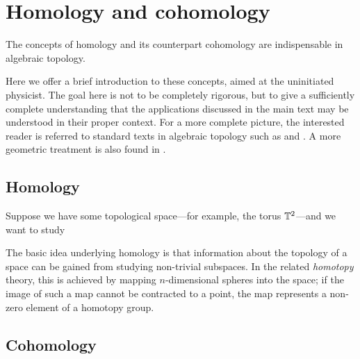 \chapter{Homology and cohomology}\label{chap:homology}

The concepts of homology and its counterpart cohomology are indispensable in algebraic topology. \red{[\ldots]}  %

Here we offer a brief introduction to these concepts, aimed at the uninitiated physicist. The goal here is not to be completely rigorous, but to give a sufficiently complete understanding that the applications discussed in the main text may be understood in their proper context. For a more complete picture, the interested reader is referred to standard texts in algebraic topology such as \cite{Hatcher_algebraic-topology} and \cite{Bredon_topo-geometry}. A more geometric treatment is also found in \cite{Bott-Tu_differential-forms}.


\section{Homology}

Suppose we have some topological space---for example, the torus $\mathbb{T}^2$---and we want to study \red{[\ldots]}%

The basic idea underlying homology is that information about the topology of a space can be gained from studying non-trivial subspaces. In the related \emph{homotopy} theory, this is achieved by mapping $n$-dimensional spheres into the space; if the image of such a map cannot be contracted to a point, the map represents a non-zero element of a homotopy group.


\section{Cohomology}